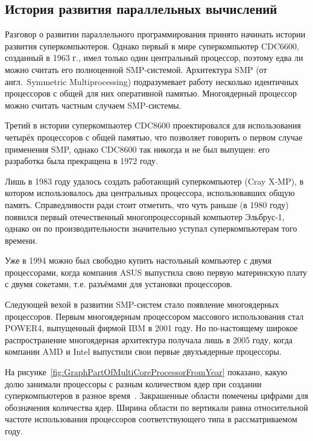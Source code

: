 \subsection{История развития параллельных вычислений}
\label{subsec:parallel-history}

Разговор о развитии параллельного программирования принято начинать истории развития суперкомпьютеров.
Однако первый в мире суперкомпьютер CDC6600, созданный в 1963 г., имел только один центральный процессор, поэтому едва ли можно считать его полноценной SMP-системой.
Архитектура SMP (от англ.\ Symmetric Multiprocessing) подразумевает работу несколько идентичных процессоров с общей для них оперативной памятью.
Многоядерный процессор можно считать частным случаем SMP-системы.

Третий в истории суперкомпьютер CDC8600 проектировался для использования четырёх процессоров с общей памятью, что позволяет говорить о первом случае применения SMP, однако CDC8600 так никогда и не был выпущен: его разработка была прекращена в 1972 году.

Лишь в 1983 году удалось создать работающий суперкомпьютер (Cray X-MP), в котором использовалось два центральных процессора, использовавших общую память.
Справедливости ради стоит отметить, что чуть раньше (в 1980 году) появился первый отечественный многопроцессорный компьютер Эльбрус-1, однако он по производительности значительно уступал суперкомпьютерам того времени.

Уже в 1994 можно был свободно купить настольный компьютер с двумя процессорами, когда компания ASUS выпустила свою первую материнскую плату с двумя сокетами, т.е. разъёмами для установки процессоров.

Следующей вехой в развитии SMP-систем стало появление многоядерных процессоров.
Первым многоядерным процессором массового использования стал POWER4, выпущенный фирмой IBM в 2001 году.
Но по-настоящему широкое распространение многоядерная архитектура получала лишь в 2005 году, когда компании AMD и Intel выпустили свои первые двухъядерные процессоры.

На рисунке~\ref{fig:GraphPartOfMultiCoreProcessorFromYear} показано, какую долю занимали процессоры с разным количеством ядер при создании суперкомпьютеров в разное время~\cite{Top500}. %
Закрашенные области помечены цифрами для обозначения количества ядер.
Ширина области по вертикали равна относительной частоте использования процессоров соответствующего типа в рассматриваемом году.

